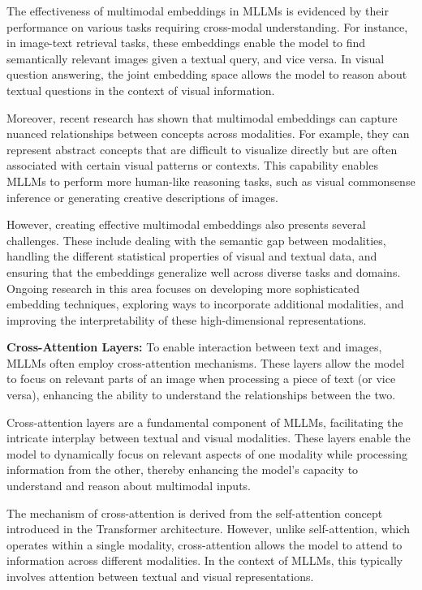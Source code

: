 The effectiveness of multimodal embeddings in MLLMs is evidenced by their performance on various tasks requiring cross-modal understanding. For instance, in image-text retrieval tasks, these embeddings enable the model to find semantically relevant images given a textual query, and vice versa. In visual question answering, the joint embedding space allows the model to reason about textual questions in the context of visual information.

Moreover, recent research has shown that multimodal embeddings can capture nuanced relationships between concepts across modalities. For example, they can represent abstract concepts that are difficult to visualize directly but are often associated with certain visual patterns or contexts. This capability enables MLLMs to perform more human-like reasoning tasks, such as visual commonsense inference or generating creative descriptions of images.

However, creating effective multimodal embeddings also presents several challenges. These include dealing with the semantic gap between modalities, handling the different statistical properties of visual and textual data, and ensuring that the embeddings generalize well across diverse tasks and domains. Ongoing research in this area focuses on developing more sophisticated embedding techniques, exploring ways to incorporate additional modalities, and improving the interpretability of these high-dimensional representations.


\textbf{Cross-Attention Layers:} To enable interaction between text and images, MLLMs often employ cross-attention mechanisms. These layers allow the model to focus on relevant parts of an image when processing a piece of text (or vice versa), enhancing the ability to understand the relationships between the two.

Cross-attention layers are a fundamental component of MLLMs, facilitating the intricate interplay between textual and visual modalities. These layers enable the model to dynamically focus on relevant aspects of one modality while processing information from the other, thereby enhancing the model's capacity to understand and reason about multimodal inputs.

The mechanism of cross-attention is derived from the self-attention concept introduced in the Transformer architecture. However, unlike self-attention, which operates within a single modality, cross-attention allows the model to attend to information across different modalities. In the context of MLLMs, this typically involves attention between textual and visual representations.

